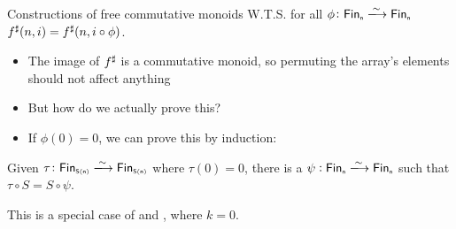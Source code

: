 \documentclass[9pt]{beamer}
\begin{document}
\begin{frame}[fragile]{Constructions of free commutative monoids}
    W.T.S. for all $\phi\colon \Fin[n]\xto{\sim}\Fin[n]$ ${f}^{\sharp}(n, i) = {f}^{\sharp}(n, i \circ \phi)$.
    \begin{itemize}
        \item The image of ${f}^{\sharp}$ is a commutative monoid, so permuting the array's elements should not affect anything
        \item But how do we actually prove this?
        \item If $\phi(0) = 0$, we can prove this by induction:
    \end{itemize}    

  \begin{tblock}
    Given $\tau\colon \Fin[S(n)]\xto{\sim}\Fin[S(n)]$ where $\tau(0) = 0$,
    there is a $\psi : \Fin[n] \xto{\sim} \Fin[n]$ such that $\tau \circ S = S \circ \psi$.
  \end{tblock}

      \begin{center}
        \hspace{1em}
    \end{center}

    This is a special case of  and , where $k = 0$.

\end{frame}
\end{document}
